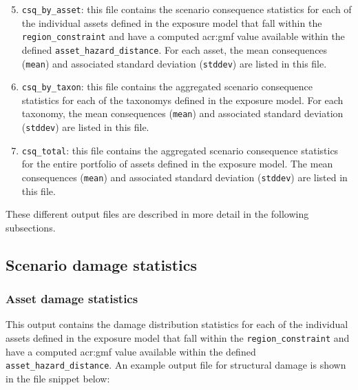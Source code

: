 \begin{enumerate}
\setcounter{enumi}{4}

  \item \Verb+csq_by_asset+: this file contains the scenario consequence
    statistics for each of the individual \glspl{asset} defined in the
    \gls{exposure model} that fall within the \Verb+region_constraint+ and have
    a computed \gls{acr:gmf} value available within the defined
    \Verb+asset_hazard_distance+. For each \gls{asset}, the mean consequences
    (\Verb+mean+) and associated standard deviation (\Verb+stddev+) are listed
    in this file.

  \item \Verb+csq_by_taxon+: this file contains the aggregated scenario
    consequence statistics for each of the \glspl{taxonomy} defined in the
    \gls{exposure model}. For each \gls{taxonomy}, the mean consequences
    (\Verb+mean+) and associated standard deviation (\Verb+stddev+) are listed
    in this file.

  \item \Verb+csq_total+: this file contains the aggregated scenario
    consequence statistics for the entire portfolio of \glspl{asset} defined
    in the \gls{exposure model}. The mean consequences (\Verb+mean+) and 
    associated standard deviation (\Verb+stddev+) are listed in this file.

\end{enumerate}

These different output files are described in more detail in the following
subsections.


\subsection{Scenario damage statistics}
\label{subsec:scenario_damage_statistics}

\subsubsection{Asset damage statistics}
\label{subsubsec:scenario_asset_damage_statistics}

This output contains the damage distribution statistics for each of the
individual \glspl{asset} defined in the \gls{exposure model} that fall within
the \Verb+region_constraint+ and have a computed \gls{acr:gmf} value available
within the defined \Verb+asset_hazard_distance+. An example output file for
structural damage is shown in the file snippet below:

